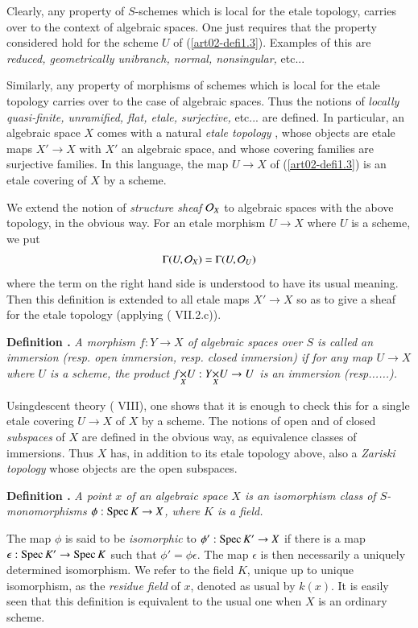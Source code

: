 Clearly, any property of $S$-schemes which is local for the etale topology, carries over to the context of algebraic spaces. One just requires that the property considered hold for the scheme $U$ of (\ref{art02-defi1.3}). Examples of this are {\em reduced, geometrically unibranch, normal, nonsingular,} etc...

Similarly, any property of morphisms of schemes which is local for the etale topology carries over to the case of algebraic spaces. Thus the notions of {\em locally quasi-finite, unramified, flat, etale, surjective,} etc... are defined. In particular, an algebraic space $X$ comes with a natural {\em etale topology} \cite{art02-key1}, whose objects are etale maps $X'\to X$ with $X'$ an algebraic space, and whose covering families are surjective families. In this language, the map $U\to X$ of (\ref{art02-defi1.3}) is an etale covering of $X$ by a scheme.

We extend the notion of {\em structure sheaf} $\mathcal{O}_{X}$ to algebraic spaces with the above topology, in the obvious way. For an etale morphism $U\to X$ where $U$ is a scheme, we put
$$
\Gamma (U,\mathcal{O}_{X})=\Gamma(U,\mathcal{O}_{U})
$$
where the term on the right hand side is understood to have its usual meaning. Then this definition is extended to all etale maps $X'\to X$ so as to give a sheaf for the etale topology (applying (\cite{art02-key6} VII.2.c)).

\medskip
\noindent
{\bf Definition .\label{art02-defi2.2}}
{\em A morphism $f:Y\to X$ of algebraic spaces over $S$ is called an immersion (resp. open immersion, resp. closed immersion) if for any map $U\to X$ where $U$ is a scheme, the product $\fprod{f}{U}{X}:\fprod{Y}{U}{X}\to U$ is an immersion (resp......).}
\smallskip

Using\pageoriginale descent theory (\cite{art02-key14} VIII), one shows that it is enough to check this for a single etale covering $U\to X$ of $X$ by a scheme. The notions of open and of closed {\em subspaces} of $X$ are defined in the obvious way, as equivalence classes of immersions. Thus $X$ has, in addition to its etale topology above, also a {\em Zariski topology} whose objects are the open subspaces.

\medskip
\noindent
{\bf Definition .\label{art02-defi2.3}}
{\em A point $x$ of an algebraic space $X$ is an isomorphism class of $S$-monomorphisms $\phi:\operatorname{Spec} K\to X$, where $K$ is a field.}
\smallskip

The map $\phi$ is said to be {\em isomorphic} to $\phi':\operatorname{Spec} K'\to X$ if there is a map $\epsilon : \operatorname{Spec} K'\to \operatorname{Spec} K$ such that $\phi'=\phi\epsilon$. The map $\epsilon$ is then necessarily a uniquely determined isomorphism. We refer to the field $K$, unique up to unique isomorphism, as the {\em residue field} of $x$, denoted as usual by $k(x)$. It is easily seen that this definition is equivalent to the usual one when $X$ is an ordinary scheme.


